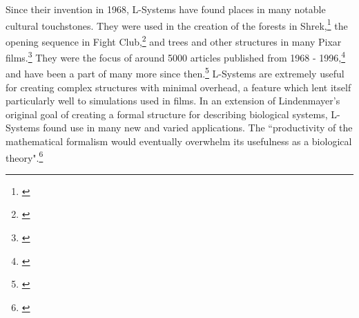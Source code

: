 \documentclass[12pt,twoside]{reedthesis}
\begin{document}
	Since their invention in 1968, L-Systems have found places in many notable cultural touchstones. They were used in the creation of the forests in Shrek,\footnote{\cite{shrek2001}} the opening sequence in Fight Club,\footnote{\cite{FightClub1999}} and trees and other structures in many Pixar films.\footnote{\cite{theory2004}} They were the focus of around 5000 articles published from 1968 - 1996,\footnote{\cite{theory2004}} and have been a part of many more since then.\footnote{\cite{manyPapers}} L-Systems are extremely useful for creating complex structures with minimal overhead, a feature which lent itself particularly well to simulations used in films. In an extension of Lindenmayer's original goal of creating a formal structure for describing biological systems, L-Systems found use in many new and varied applications. The ``productivity of the mathematical formalism would eventually overwhelm its usefulness as a biological theory".\footnote{\cite{theory2004}}\\
	
	
	
	
\end{document}
